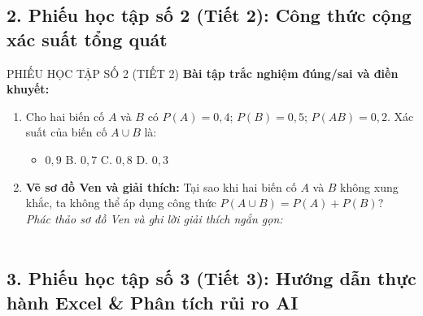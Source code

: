 \documentclass[12pt, a4paper]{article}
\begin{document}
\subsection*{2. Phiếu học tập số 2 (Tiết 2): Công thức cộng xác suất tổng quát}

\begin{pedabox}{PHIẾU HỌC TẬP SỐ 2 (TIẾT 2)}
\textbf{Bài tập trắc nghiệm đúng/sai và điền khuyết:}
\begin{enumerate}[leftmargin=0.6cm]
    \item Cho hai biến cố $A$ và $B$ có $P(A) = 0{,}4$; $P(B) = 0{,}5$; $P(AB) = 0{,}2$. Xác suất của biến cố $A \cup B$ là:
    \begin{itemize}[leftmargin=0.5cm]
        \item[A.] $0{,}9$ \quad B. $0{,}7$ \quad C. $0{,}8$ \quad D. $0{,}3$
    \end{itemize}
    \item \textbf{Vẽ sơ đồ Ven và giải thích:} Tại sao khi hai biến cố $A$ và $B$ không xung khắc, ta không thể áp dụng công thức $P(A \cup B) = P(A) + P(B)$?\\
    \textit{Phác thảo sơ đồ Ven và ghi lời giải thích ngắn gọn:}\\
    \dotfill\\
    \dotfill
\end{enumerate}
\end{pedabox}

\subsection*{3. Phiếu học tập số 3 (Tiết 3): Hướng dẫn thực hành Excel \& Phân tích rủi ro AI}
\end{document}
